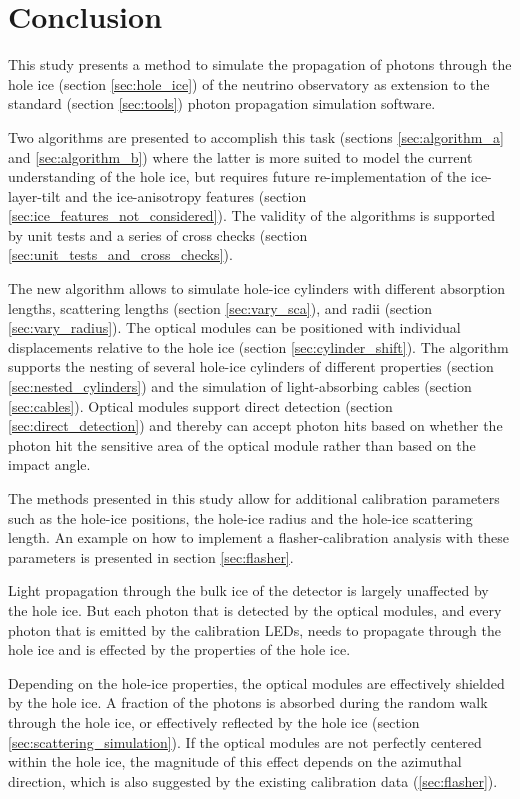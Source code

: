 
\section{Conclusion}
\label{sec:conclusion}

This study presents a method to simulate the propagation of photons through the hole ice (section \ref{sec:hole_ice}) of the \icecube neutrino observatory as extension to the standard \clsim (section \ref{sec:tools}) photon propagation simulation software.

Two algorithms are presented to accomplish this task (sections \ref{sec:algorithm_a} and \ref{sec:algorithm_b}) where the latter is more suited to model the current understanding of the hole ice, but requires future re-implementation of the ice-layer-tilt and the ice-anisotropy features (section \ref{sec:ice_features_not_considered}). The validity of the algorithms is supported by unit tests and a series of cross checks (section \ref{sec:unit_tests_and_cross_checks}).

The new algorithm allows to simulate hole-ice cylinders with different absorption lengths, scattering lengths (section \ref{sec:vary_sca}), and radii (section \ref{sec:vary_radius}). The optical modules can be positioned with individual displacements relative to the hole ice (section \ref{sec:cylinder_shift}). The algorithm supports the nesting of several hole-ice cylinders of different properties (section \ref{sec:nested_cylinders}) and the simulation of light-absorbing cables (section \ref{sec:cables}). Optical modules support direct detection (section \ref{sec:direct_detection}) and thereby can accept photon hits based on whether the photon hit the sensitive area of the optical module rather than based on the impact angle.

The methods presented in this study allow for additional calibration parameters such as the hole-ice positions, the hole-ice radius and the hole-ice scattering length. An example on how to implement a flasher-calibration analysis with these parameters is presented in section \ref{sec:flasher}.

Light propagation through the bulk ice of the \icecube detector is largely unaffected by the hole ice. But each photon that is detected by the optical modules, and every photon that is emitted by the calibration LEDs, needs to propagate through the hole ice and is effected by the properties of the hole ice.

Depending on the hole-ice properties, the optical modules are effectively shielded by the hole ice. A fraction of the photons is absorbed during the random walk through the hole ice, or effectively reflected by the hole ice (section \ref{sec:scattering_simulation}). If the optical modules are not perfectly centered within the hole ice, the magnitude of this effect depends on the azimuthal direction, which is also suggested by the existing calibration data (\ref{sec:flasher}).

